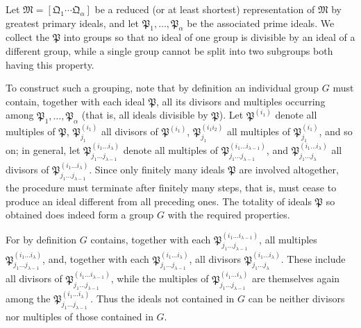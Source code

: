 \documentclass[11pt]{article}
\providecommand{\ideal}[1]{\mathfrak{#1}}
\begin{document}
Let $\ideal M=[\ideal Q_1\cdots\ideal Q_\alpha]$ be a reduced (or at least shortest) representation of $\ideal M$ by greatest primary ideals, and let $\ideal P_1,
\ldots,\ideal P_\alpha$ be the associated prime ideals. We collect the $\ideal P$ into groups so that no ideal of one group is divisible by an ideal of a different group, while a single group cannot be split into two subgroups both having this property.

To construct such a grouping, note that by definition an individual group $G$ must contain, together with each ideal $\ideal P$, all its divisors and multiples occurring among $\ideal P_1,\ldots,\ideal P_\alpha$ (that is, all ideals divisible by $\ideal P$). Let $\ideal P^{(i_1)}$ denote all multiples of $\ideal P$, $\ideal P_{j_1}^{(i_1)}$ all divisors of $\ideal P^{(i_1)}$, $\ideal P_{j_1}^{(i_1i_2)}$ all multiples of $\ideal P_{j_1}^{(i_1)}$, and so on; in general, let $\ideal P_{j_1\ldots j_{\lambda-1}}^{(i_1\ldots i_\lambda)}$ denote all multiples of $\ideal P_{j_1\ldots j_{\lambda-1}}^{(i_1\ldots i_{\lambda-1})}$, and $\ideal P_{j_1\ldots j_\lambda}^{(i_1\ldots i_\lambda)}$ all divisors of $\ideal P_{j_1\ldots j_{\lambda-1}}^{(i_1\ldots i_\lambda)}$. Since only finitely many ideals $\ideal P$ are involved altogether, the procedure must terminate after finitely many steps, that is, must cease to produce an ideal different from all preceding ones. The totality of ideals $\ideal P$ so obtained does indeed form a group $G$ with the required properties.

For by definition $G$ contains, together with each $\ideal P_{j_1\ldots j_{\lambda-1}}^{(i_1\ldots i_{\lambda-1})}$, all multiples $\ideal P_{j_1\ldots j_{\lambda-1}}^{(i_1\ldots i_\lambda)}$, and, together with each $\ideal P_{j_1\ldots j_{\lambda-1}}^{(i_1\ldots i_\lambda)}$, all divisors $\ideal P_{j_1\ldots j_\lambda}^{(i_1\ldots i_\lambda)}$. These include all divisors of $\ideal P_{j_1\ldots j_{\lambda-1}}^{(i_1\ldots i_{\lambda-1})}$, while the multiples of $\ideal P_{j_1\ldots j_{\lambda-1}}^{(i_1\ldots i_\lambda)}$ are themselves again among the $\ideal P_{j_1\ldots j_{\lambda-1}}^{(i_1\ldots i_\lambda)}$. Thus the ideals not contained in $G$ can be neither divisors nor multiples of those contained in $G$.
\end{document}
